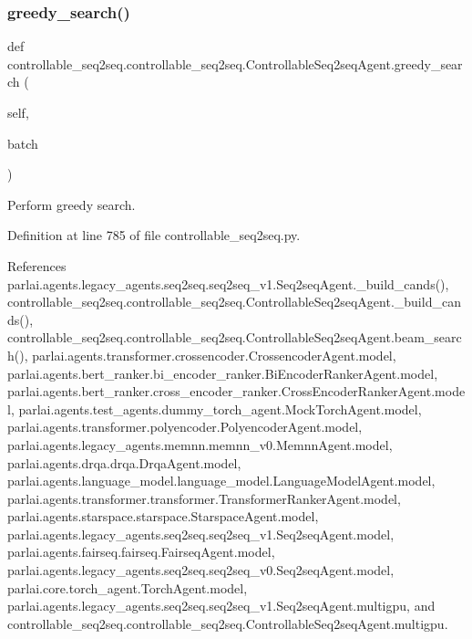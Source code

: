 \subsubsection{\texorpdfstring{greedy\+\_\+search()}{greedy\_search()}}
{\footnotesize\ttfamily def controllable\+\_\+seq2seq.\+controllable\+\_\+seq2seq.\+Controllable\+Seq2seq\+Agent.\+greedy\+\_\+search (\begin{DoxyParamCaption}\item[{}]{self,  }\item[{}]{batch }\end{DoxyParamCaption})}

\begin{DoxyVerb}Perform greedy search.\end{DoxyVerb}
 

Definition at line 785 of file controllable\+\_\+seq2seq.\+py.



References parlai.\+agents.\+legacy\+\_\+agents.\+seq2seq.\+seq2seq\+\_\+v1.\+Seq2seq\+Agent.\+\_\+build\+\_\+cands(), controllable\+\_\+seq2seq.\+controllable\+\_\+seq2seq.\+Controllable\+Seq2seq\+Agent.\+\_\+build\+\_\+cands(), controllable\+\_\+seq2seq.\+controllable\+\_\+seq2seq.\+Controllable\+Seq2seq\+Agent.\+beam\+\_\+search(), parlai.\+agents.\+transformer.\+crossencoder.\+Crossencoder\+Agent.\+model, parlai.\+agents.\+bert\+\_\+ranker.\+bi\+\_\+encoder\+\_\+ranker.\+Bi\+Encoder\+Ranker\+Agent.\+model, parlai.\+agents.\+bert\+\_\+ranker.\+cross\+\_\+encoder\+\_\+ranker.\+Cross\+Encoder\+Ranker\+Agent.\+model, parlai.\+agents.\+test\+\_\+agents.\+dummy\+\_\+torch\+\_\+agent.\+Mock\+Torch\+Agent.\+model, parlai.\+agents.\+transformer.\+polyencoder.\+Polyencoder\+Agent.\+model, parlai.\+agents.\+legacy\+\_\+agents.\+memnn.\+memnn\+\_\+v0.\+Memnn\+Agent.\+model, parlai.\+agents.\+drqa.\+drqa.\+Drqa\+Agent.\+model, parlai.\+agents.\+language\+\_\+model.\+language\+\_\+model.\+Language\+Model\+Agent.\+model, parlai.\+agents.\+transformer.\+transformer.\+Transformer\+Ranker\+Agent.\+model, parlai.\+agents.\+starspace.\+starspace.\+Starspace\+Agent.\+model, parlai.\+agents.\+legacy\+\_\+agents.\+seq2seq.\+seq2seq\+\_\+v1.\+Seq2seq\+Agent.\+model, parlai.\+agents.\+fairseq.\+fairseq.\+Fairseq\+Agent.\+model, parlai.\+agents.\+legacy\+\_\+agents.\+seq2seq.\+seq2seq\+\_\+v0.\+Seq2seq\+Agent.\+model, parlai.\+core.\+torch\+\_\+agent.\+Torch\+Agent.\+model, parlai.\+agents.\+legacy\+\_\+agents.\+seq2seq.\+seq2seq\+\_\+v1.\+Seq2seq\+Agent.\+multigpu, and controllable\+\_\+seq2seq.\+controllable\+\_\+seq2seq.\+Controllable\+Seq2seq\+Agent.\+multigpu.



